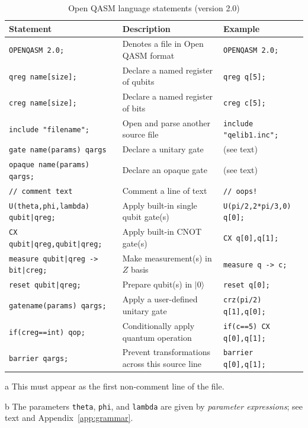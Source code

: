 \documentclass[USenglish,12pt,fleqn]{article} %
\newcommand*{\code}{\texttt}
\begin{document}
\begin{landscape}
\begin{table}[htbp]
\begin{threeparttable}
\caption{Open QASM language statements (version 2.0)\label{tab:qasm:new}}
\begin{tabular}{@{}lll@{}}
\toprule
Statement & Description & Example \\
\midrule
\code{OPENQASM 2.0;} & Denotes a file in Open QASM format\tnote{a} & \code{OPENQASM 2.0;}\\
\code{qreg name[size];} & Declare a named register of qubits & \code{qreg q[5];} \\
\code{creg name[size];} & Declare a named register of bits & \code{creg c[5];} \\
\code{include "filename";} & Open and parse another source file & \code{include "qelib1.inc";} \\ 
\code{gate name(params) qargs \string{ body \string}} & Declare a unitary gate &  (see text) \\
\code{opaque name(params) qargs;} & Declare an opaque gate & (see text) \\
\code{// comment text} & Comment a line of text & \code{// oops!} \\
\midrule
\code{U(theta,phi,lambda) qubit|qreg;} & Apply built-in single qubit gate(s)\tnote{b} & \code{U(pi/2,2*pi/3,0) q[0];} \\
\code{CX qubit|qreg,qubit|qreg;} & Apply built-in CNOT gate(s) & \code{CX q[0],q[1];} \\
\code{measure qubit|qreg -> bit|creg;} & Make measurement(s) in $Z$ basis & \code{measure q -> c;} \\
\code{reset qubit|qreg;} & Prepare qubit(s) in $|0\rangle$ & \code{reset q[0];} \\ 
\code{gatename(params) qargs;} & Apply a user-defined unitary gate &  \code{crz(pi/2) q[1],q[0];} \\
\code{if(creg==int) qop;} & Conditionally apply quantum operation & \code{if(c==5) CX q[0],q[1];} \\ 
\midrule
\code{barrier qargs;} & Prevent transformations across this source line & \code{barrier q[0],q[1];} \\
\bottomrule
\end{tabular}
\begin{tablenotes}
\item[a] This must appear as the first non-comment line of the file.
\item[b] The parameters \code{theta}, \code{phi}, and \code{lambda} are given by {\em parameter expressions}; see text and Appendix~\ref{app:grammar}.
\end{tablenotes}
\end{threeparttable}
\end{table}
\end{landscape}
\end{document}
